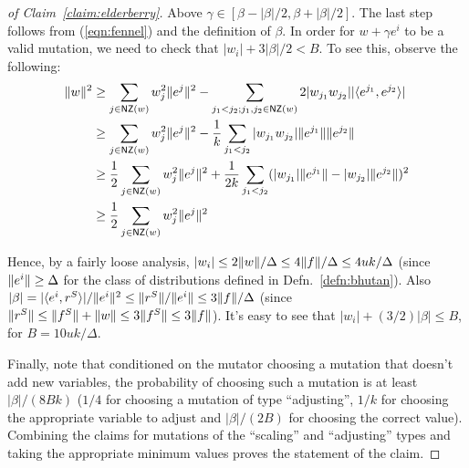 \begin{proof}[of Claim~\ref{claim:elderberry}]
Above $\gamma \in [\beta - |\beta|/2, \beta + |\beta|/2]$. The last step follows
from (\ref{eqn:fennel}) and the definition of $\beta$.
In order for $w + \gamma e^i$ to be a valid mutation, we need to check that
$|w_i| + 3 |\beta|/2 < B$. To see this, observe the following:
\begin{align*}
\ltwonorm{w}^2 &\geq \sum_{j \in \NZ(w)} w_j^2 \ltwonorm{e^j}^2 - \sum_{j_1 < j_2; j_1,
j_2 \in \NZ(w)} 2 |w_{j_1} w_{j_2}| |\ip{e^{j_1}}{e^{j_2}}| \\
&\geq \sum_{j \in \NZ(w)} w_j^2 \ltwonorm{e^j}^2 - \frac{1}{k} \sum_{j_1 < j_2}
|w_{j_1} w_{j_2}| \ltwonorm{e^{j_1}}\ltwonorm{e^{j_2}} \\
&\geq \frac{1}{2} \sum_{j \in \NZ(w)} w_j^2 \ltwonorm{e^j}^2 + \frac{1}{2k} \sum_{j_1 < j_2}
(|w_{j_1}| \ltwonorm{e^{j_1}} - |w_{j_2}| \ltwonorm{e^{j_2}})^2 \\
&\geq \frac{1}{2} \sum_{j \in \NZ(w)} w_j^2 \ltwonorm{e^j}^2 %
\end{align*}

\noindent Hence, by a fairly loose analysis, $|w_i|  \leq 2 \Vert w \Vert/\Delta
\leq 4 \Vert f \Vert/\Delta \leq 4uk/\Delta$ (since $\Vert e^i \Vert \geq \Delta$
for the class of distributions defined in Defn.~\ref{defn:bhutan}). Also
$|\beta| = |\langle e^i, r^S \rangle|/\Vert e^i \Vert^2 \leq \Vert r^S \Vert/\Vert e^i \Vert
\leq 3 \Vert f \Vert/\Delta$ (since $\Vert r^S \Vert \leq \Vert f^S \Vert +
\Vert w \Vert \leq 3 \Vert f^S \Vert \leq 3 \Vert f \Vert$). It's easy to see that
$|w_i| + (3/2) |\beta| \leq B$, for $B = 10 uk/\Delta$.

Finally, note that conditioned on the mutator choosing a mutation that doesn't
add new variables, the probability of choosing such a mutation is at least
$|\beta|/(8Bk)$ ($1/4$ for choosing a mutation of type ``adjusting'', $1/k$ for
choosing the appropriate variable to adjust and $|\beta|/(2B)$ for choosing the
correct value). Combining the claims for mutations of the ``scaling'' and
``adjusting'' types and taking the appropriate minimum values proves the
statement of the claim.
\end{proof}
